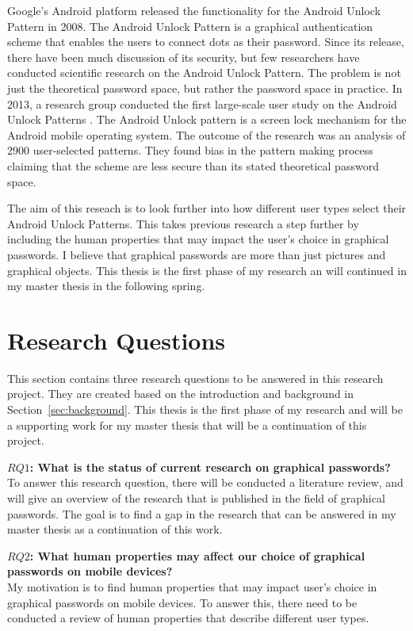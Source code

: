   Google's Android platform released the functionality for the Android Unlock Pattern in 2008. The Android Unlock Pattern is a graphical authentication scheme that enables the users to connect dots as their password. Since its release, there have been much discussion of its security, but few researchers have conducted scientific research on the Android Unlock Pattern. The problem is not just the theoretical password space, but rather the password space in practice. In 2013, a research group conducted the first large-scale user study on the Android Unlock Patterns \cite{Uellenbeck}. The Android Unlock pattern is a screen lock mechanism for the Android mobile operating system. The outcome of the research was an analysis of 2900 user-selected patterns. They found bias in the pattern making process claiming that the scheme are less secure than its stated theoretical password space.

  The aim of this reseach is to look further into how different user types select their Android Unlock Patterns. This takes previous research a step further by including the human properties that may impact the user's choice in graphical passwords. I believe that graphical passwords are more than just pictures and graphical objects. This thesis is the first phase of my research an will continued in my master thesis in the following spring.

  \section{Research Questions} \label{sec:researchquestions}
    
  This section contains three research questions to be answered in this research project. They are created based on the introduction and background in Section~\ref{sec:background}. This thesis is the first phase of my research and will be a supporting work for my master thesis that will be a continuation of this project.

  {\bf $RQ1$: What is the status of current research on graphical passwords?} \\
  To answer this research question, there will be conducted a literature review, and will give an overview of the research that is published in the field of graphical passwords. The goal is to find a gap in the research that can be answered in my master thesis as a continuation of this work.

  {\bf $RQ2$: What human properties may affect our choice of graphical passwords on mobile devices?}\\
  My motivation is to find human properties that may impact user's choice in graphical passwords on mobile devices. To answer this, there need to be conducted a review of human properties that describe different user types.


